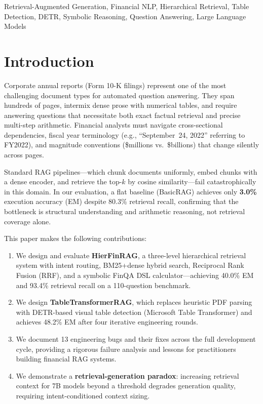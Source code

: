 \documentclass[conference]{IEEEtran}
\begin{document}
\begin{IEEEkeywords}
Retrieval-Augmented Generation, Financial NLP, Hierarchical Retrieval, Table
Detection, DETR, Symbolic Reasoning, Question Answering, Large Language Models
\end{IEEEkeywords}

\section{Introduction}

Corporate annual reports (Form 10-K filings) represent one of the most
challenging document types for automated question answering. They span hundreds
of pages, intermix dense prose with numerical tables, and require answering
questions that necessitate both exact factual retrieval and precise multi-step
arithmetic. Financial analysts must navigate cross-sectional dependencies, fiscal
year terminology (e.g., ``September~24, 2022'' referring to FY2022), and
magnitude conventions (\$millions vs.\ \$billions) that change silently across
pages.

Standard RAG pipelines---which chunk documents uniformly, embed chunks with a
dense encoder, and retrieve the top-$k$ by cosine similarity---fail
catastrophically in this domain. In our evaluation, a flat baseline (BasicRAG)
achieves only \textbf{3.0\%} execution accuracy (EM) despite 80.3\% retrieval
recall, confirming that the bottleneck is structural understanding and arithmetic
reasoning, not retrieval coverage alone.

This paper makes the following contributions:
\begin{enumerate}
  \item We design and evaluate \textbf{HierFinRAG}, a three-level hierarchical
        retrieval system with intent routing, BM25+dense hybrid search, Reciprocal
        Rank Fusion (RRF), and a symbolic FinQA DSL calculator---achieving 40.0\%
        EM and 93.4\% retrieval recall on a 110-question benchmark.
  \item We design \textbf{TableTransformerRAG}, which replaces heuristic PDF
        parsing with DETR-based visual table detection (Microsoft Table
        Transformer) and achieves 48.2\% EM after four iterative engineering
        rounds.
  \item We document 13 engineering bugs and their fixes across the full
        development cycle, providing a rigorous failure analysis and lessons for
        practitioners building financial RAG systems.
  \item We demonstrate a \textbf{retrieval-generation paradox}: increasing
        retrieval context for 7B models beyond a threshold degrades generation
        quality, requiring intent-conditioned context sizing.
\end{enumerate}
\end{document}
